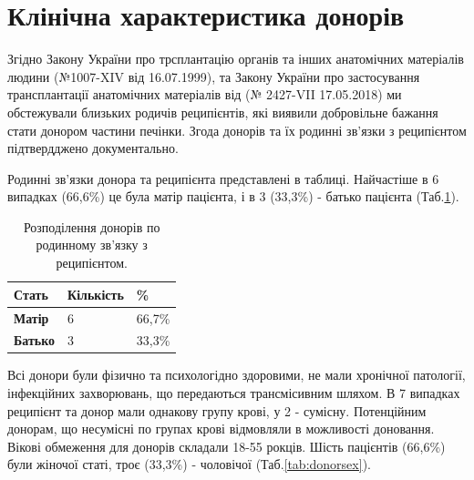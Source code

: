\section{Клінічна характеристика донорів}
Згідно Закону України про трсплантацію органів та інших анатомічних матеріалів людини (№1007-XIV від 16.07.1999), та Закону України про застосування трансплантації анатомічних матеріалів від (№ 2427-VII  17.05.2018) ми обстежували близьких родичів реципієнтів, які виявили добровільне бажання стати донором частини печінки. Згода донорів та їх родинні зв'язки з реципієнтом підтвердджено документально. 

Родинні зв'язки донора та реципієнта представлені в таблиці. Найчастіше в 6 випадках (66,6\%) це була матір пацієнта, і в 3 (33,3\%) - батько пацієнта (Таб.\ref{tab:donorrec}). 

\begin{table}[]
\centering
\caption{Розподілення донорів по родинному зв'язку з реципієнтом.}
\label{tab:donorrec}
\begin{tabular}{|l|l|l|}
\hline
\textbf{Стать}  & {\color[HTML]{231F20} \textbf{Кількість}} & {\color[HTML]{231F20} \textbf{\%}} \\ \hline
\textbf{Матір}  & 6                                         & 66,7\%                             \\ \hline
\textbf{Батько} & 3                                         & 33,3\%                             \\ \hline
\end{tabular}
\end{table}

Всі донори були фізично та психологідно здоровими, не мали хронічної патології, інфекційних захворювань, що передаються трансмісивним шляхом. В 7 випадках реципієнт та донор мали однакову групу крові, у 2 - сумісну. Потенційним донорам, що несумісні по групах крові відмовляли в можливості доновання. Вікові обмеження для донорів складали 18-55 рокців. 
Шість пацієнтів (66,6\%) були жіночої статі, троє (33,3\%) - чоловічої (Таб.\ref{tab:donorsex}).

